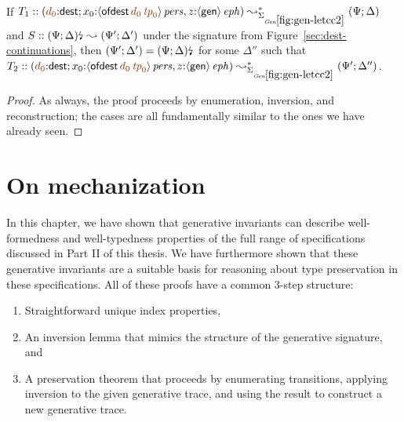 \bigskip
\begin{theorem} ~
  \label{thm:siggenletcc}
  \smallskip

  If $T_1 :: \left(\lf{d_0}{:}{\sf dest}; x_0{:}\ispers{\susp{{\sf
          ofdest}\,\lf{d_0}\,\lf{{\it tp}_0}}}, z{:}\iseph{\susp{{\sf
          gen}}}\right) \leadsto^*_{\siggenletcc} \left(\Psi; \Delta
  \right)$ and $S :: {\left(\Psi; \Delta\right)}{\mbox{\lightning}}_{}
  \leadsto \left(\Psi'; \Delta'\right)$ under the signature from
  Figure~\ref{sec:dest-continuations}, then $(\Psi'; \Delta') =
  {\left(\Psi; \Delta\right)}{\mbox{\lightning}}_{}$ for some $\Delta''$
  such that $T_2 :: \left(\lf{d_0}{:}{\sf dest}; x_0{:}\ispers{\susp{{\sf
          ofdest}\,\lf{d_0}\,\lf{{\it tp}_0}}}, z{:}\iseph{\susp{{\sf
          gen}}}\right) \leadsto^*_{\siggenletcc} \left(\Psi'; \Delta''
  \right)$.
\end{theorem}

\begin{proof}
  As always, the proof proceeds by enumeration, inversion, and
  reconstruction; the cases are all fundamentally similar to the ones
  we have already seen.
\end{proof}

\newpage

\section{On mechanization}

In this chapter, we have shown that generative invariants can describe
well-formedness and well-typedness properties of the full range of
specifications discussed in Part II of this thesis. We have
furthermore shown that these generative invariants are a suitable
basis for reasoning about type preservation in these specifications.
All of these proofs have a common 3-step structure: 

\smallskip
\begin{enumerate}
\item Straightforward unique index properties,
\item An inversion lemma that mimics the
  structure of the generative signature, and
\item A preservation theorem that proceeds by enumerating transitions,
applying inversion to the given generative trace, and using the result
to construct a new generative trace.
\end{enumerate}
\smallskip

